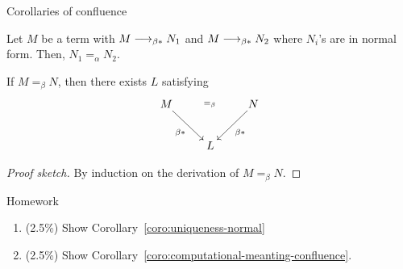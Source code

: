 \begin{frame}{Corollaries of confluence}
  \begin{corollary}
    Let $M$ be a term with $M \longrightarrow_{\beta*} N_1$ and $M\longrightarrow_{\beta*} N_2$ where
     $N_i$'s are in normal form. Then, $N_1 =_\alpha N_2$.
    \label{coro:uniqueness-normal}%
  \end{corollary}
  

  \begin{corollary}
    If $M =_\beta N$, then there exists $L$ satisfying
  \[
    \xymatrix{
      M \ar[rd]_{\beta*} \ar@{}[rr]|{=_\beta} & & N \ar[ld]^{\beta*} \\
      & L
    }
  \]
  \label{coro:computational-meanting-confluence}
  \end{corollary}
  \begin{proof}[Proof sketch]
    By induction on the derivation of $M =_\beta N$. 
  \end{proof}

\end{frame}


\begin{frame}{Homework}
  \begin{enumerate}
    \item (2.5\%) Show Corollary~\ref{coro:uniqueness-normal}
    \item (2.5\%) Show Corollary~\ref{coro:computational-meanting-confluence}.
  \end{enumerate}
\end{frame}

\appendix 
